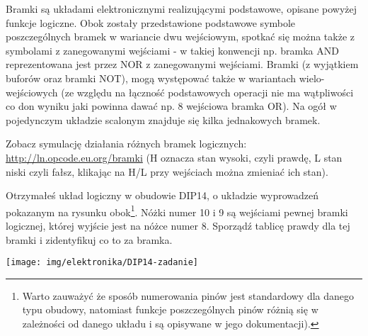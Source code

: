 \documentclass{pdfBooklets}
\begin{document}
Bramki są układami elektronicznymi realizującymi podstawowe, opisane powyżej funkcje logiczne. Obok zostały przedstawione podstawowe symbole poszczególnych bramek w wariancie dwu wejściowym, spotkać się można także z symbolami z zanegowanymi wejściami - w takiej konwencji np. bramka AND reprezentowana jest przez NOR z zanegowanymi wejściami. Bramki (z wyjątkiem buforów oraz bramki NOT), mogą występować także w wariantach wielo-wejściowych (ze względu na łączność podstawowych operacji nie ma wątpliwości co don wyniku jaki powinna dawać np. 8 wejściowa bramka OR). Na ogół w pojedynczym układzie scalonym znajduje się kilka jednakowych bramek.

Zobacz symulację działania różnych bramek logicznych: \url{http://ln.opcode.eu.org/bramki} (H oznacza stan wysoki, czyli prawdę, L stan niski czyli fałsz, klikając na H/L przy wejściach można zmieniać ich stan).

\begin{Zadanie}{}{}
\noindent\begin{minipage}[t]{\textwidth}
	\noindent\parbox[b]{0.7\textwidth}{
		Otrzymałeś układ logiczny w obudowie DIP14, o układzie wyprowadzeń pokazanym na rysunku obok\footnote{
			Warto zauważyć że sposób numerowania pinów jest standardowy dla danego typu obudowy, natomiast funkcje poszczególnych pinów różnią się w zależności od danego układu i są opisywane w jego dokumentacji).
		}.
		Nóżki numer 10 i 9 są wejściami pewnej bramki logicznej, której wyjście jest na nóżce numer 8. Sporządź tablicę prawdy dla tej bramki i zidentyfikuj co to za bramka.
		\vspace{0.25cm}
	}\hfill\parbox[b]{0.25\textwidth}{
		\texttt{[image: img/elektronika/DIP14-zadanie]}
		\vspace{-0.5cm}
	}
\end{minipage}
\end{Zadanie}
\end{document}
